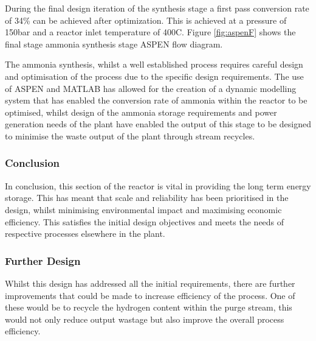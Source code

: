 \documentclass[11pt, a4paper]{article}
\newcommand\tc{400}
\newcommand\pbar{150}
\newcommand\conv{34}	%
\begin{document}
During the final design iteration of the synthesis stage a first pass conversion rate of \conv \% can be achieved after optimization. This is achieved at a pressure of \pbar  bar and a reactor inlet temperature of \tc\textdegree C. Figure \ref{fig:aspenF} shows the final stage ammonia synthesis stage ASPEN flow diagram. 

 The ammonia synthesis, whilst a well established process requires careful design and optimisation of the process due to the specific design requirements. The use of ASPEN and MATLAB has allowed for the creation of a dynamic modelling system that has enabled the conversion rate of ammonia within the reactor to be optimised, whilst design of the ammonia storage requirements and power generation needs of the plant have enabled the output of this stage to be designed to minimise the waste output of the plant through stream recycles.

\subsubsection{Conclusion}

In conclusion, this section of the reactor is vital in providing the long term energy storage. This has meant that scale and reliability has been prioritised in the design, whilst minimising environmental impact and maximising economic efficiency. This satisfies the initial design objectives and meets the needs of respective processes elsewhere in the plant. 


\subsubsection{Further Design}
Whilst this design has addressed all the initial requirements, there are further improvements that could be made to increase efficiency of the process. One of these would be to recycle the hydrogen content within the purge stream, this would not only reduce output wastage but also improve the overall process efficiency. 



\end{document}
